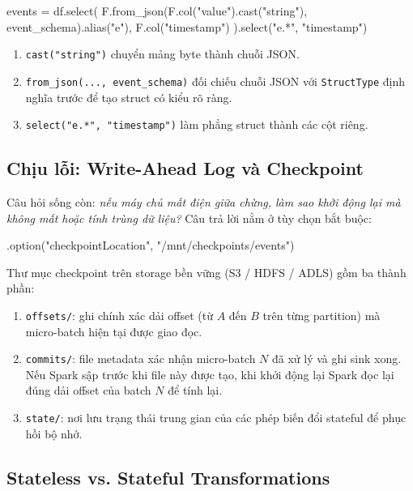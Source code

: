 \documentclass[12pt]{article}
\begin{document}
\begin{aivnpybox}
events = df.select(
    F.from_json(F.col("value").cast("string"), event_schema).alias("e"),
    F.col("timestamp")
).select("e.*", "timestamp")
\end{aivnpybox}

\begin{enumerate}
    \item \texttt{cast("string")} chuyển mảng byte thành chuỗi JSON.
    \item \texttt{from\_json(..., event\_schema)} đối chiếu chuỗi JSON với \texttt{StructType} định nghĩa trước để tạo struct có kiểu rõ ràng.
    \item \texttt{select("e.*", "timestamp")} làm phẳng struct thành các cột riêng.
\end{enumerate}

\subsection{Chịu lỗi: Write-Ahead Log và Checkpoint}

Câu hỏi sống còn: \textit{nếu máy chủ mất điện giữa chừng, làm sao khởi động lại mà không mất hoặc tính trùng dữ liệu?} Câu trả lời nằm ở tùy chọn bắt buộc:

\begin{aivnpybox}[Checkpoint]
.option("checkpointLocation", "/mnt/checkpoints/events")
\end{aivnpybox}

Thư mục checkpoint trên storage bền vững (S3 / HDFS / ADLS) gồm ba thành phần:

\begin{enumerate}
    \item \texttt{offsets/}: ghi chính xác dải offset (từ $A$ đến $B$ trên từng partition) mà micro-batch hiện tại được giao đọc.
    \item \texttt{commits/}: file metadata xác nhận micro-batch $N$ đã xử lý và ghi sink xong. Nếu Spark sập trước khi file này được tạo, khi khởi động lại Spark đọc lại đúng dải offset của batch $N$ để tính lại.
    \item \texttt{state/}: nơi lưu trạng thái trung gian của các phép biến đổi stateful để phục hồi bộ nhớ.
\end{enumerate}

\subsection{Stateless vs. Stateful Transformations}
\end{document}
